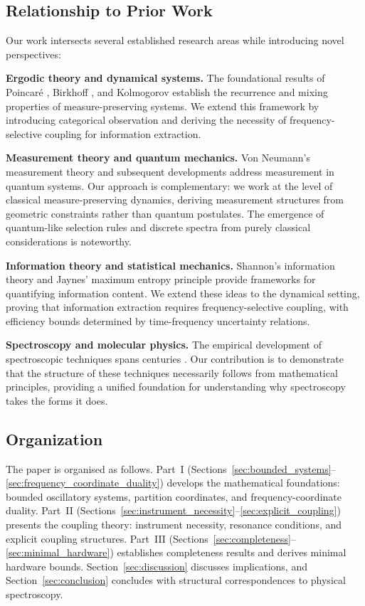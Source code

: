 \documentclass[twocolumn,10pt,a4paper]{article}
\theoremstyle{remark}
\begin{document}
\subsection{Relationship to Prior Work}

Our work intersects several established research areas while introducing novel perspectives:

\textbf{Ergodic theory and dynamical systems.} The foundational results of Poincaré \citep{Poincare1890}, Birkhoff \citep{Birkhoff1931}, and Kolmogorov \citep{Kolmogorov1954} establish the recurrence and mixing properties of measure-preserving systems. We extend this framework by introducing categorical observation and deriving the necessity of frequency-selective coupling for information extraction.

\textbf{Measurement theory and quantum mechanics.} Von Neumann's measurement theory \citep{vonNeumann1932} and subsequent developments \citep{Zurek2003, Schlosshauer2007} address measurement in quantum systems. Our approach is complementary: we work at the level of classical measure-preserving dynamics, deriving measurement structures from geometric constraints rather than quantum postulates. The emergence of quantum-like selection rules and discrete spectra from purely classical considerations is noteworthy.

\textbf{Information theory and statistical mechanics.} Shannon's information theory \citep{Shannon1948} and Jaynes' maximum entropy principle \citep{Jaynes1957} provide frameworks for quantifying information content. We extend these ideas to the dynamical setting, proving that information extraction requires frequency-selective coupling, with efficiency bounds determined by time-frequency uncertainty relations.

\textbf{Spectroscopy and molecular physics.} The empirical development of spectroscopic techniques spans centuries \citep{Herzberg1950, Atkins2011}. Our contribution is to demonstrate that the structure of these techniques necessarily follows from mathematical principles, providing a unified foundation for understanding why spectroscopy takes the forms it does.

\subsection{Organization}

The paper is organised as follows. Part~I (Sections~\ref{sec:bounded_systems}--\ref{sec:frequency_coordinate_duality}) develops the mathematical foundations: bounded oscillatory systems, partition coordinates, and frequency-coordinate duality. Part~II (Sections~\ref{sec:instrument_necessity}--\ref{sec:explicit_coupling}) presents the coupling theory: instrument necessity, resonance conditions, and explicit coupling structures. Part~III (Sections~\ref{sec:completeness}--\ref{sec:minimal_hardware}) establishes completeness results and derives minimal hardware bounds. Section~\ref{sec:discussion} discusses implications, and Section~\ref{sec:conclusion} concludes with structural correspondences to physical spectroscopy.
\end{document}
